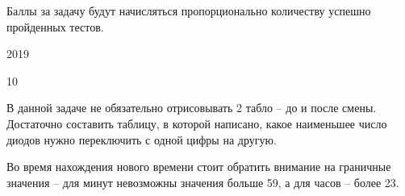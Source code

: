 \markSection

Баллы за задачу будут начисляться пропорционально количеству успешно пройденных тестов.


\begin{myverbbox}[\small]{\vinput}
    2019
\end{myverbbox}
\begin{myverbbox}[\small]{\voutput}
    10
\end{myverbbox}

\solutionSection

В данной задаче не обязательно отрисовывать 2 табло – до и после смены. Достаточно составить таблицу, в которой написано, какое наименьшее число диодов нужно переключить с одной цифры на другую. 

Во время нахождения нового времени стоит обратить внимание на граничные значения – для минут невозможны значения больше 59, а для часов – более 23.


